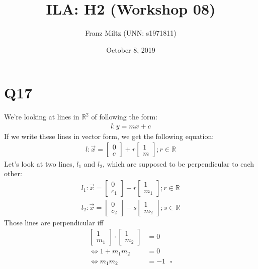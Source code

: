 \documentclass{article}
\title{ILA: H2 (Workshop 08)}
\author{Franz Miltz (UNN: s1971811)}
\date{October 8, 2019}
\begin{document}
\maketitle
\section*{Q17}
We're looking at lines in $\mathbb{R}^2$ of following the form:
\begin{align}
    l: y = mx + c
\end{align}
If we write these lines in vector form, we get the following equation:
\begin{align}
    l: \vec x =
    \begin{bmatrix}
        0 \\
        c
    \end{bmatrix}
    + r \begin{bmatrix}
        1 \\
        m
    \end{bmatrix};
    r \in \mathbb{R}
\end{align}
Let's look at two lines, $l_1$ and $l_2$, which are supposed to be perpendicular to each other:
\begin{align}
    l_1: \vec x =
    \begin{bmatrix}
        0 \\
        c_1
    \end{bmatrix}
    + r \begin{bmatrix}
        1 \\
        m_1
    \end{bmatrix};
    r \in \mathbb{R} \\
    l_2: \vec x =
    \begin{bmatrix}
        0 \\
        c_2
    \end{bmatrix}
    + s \begin{bmatrix}
        1 \\
        m_2
    \end{bmatrix};
    s \in \mathbb{R}
\end{align}
Those lines are perpendicular iff
\begin{align}
    \begin{bmatrix}
        1 \\m_1
    \end{bmatrix}
    \cdot \begin{bmatrix}
        1 \\m_2
    \end{bmatrix}
                             & = 0 \\
    \Leftrightarrow 1+m_1m_2 & =0  \\ \Leftrightarrow m_1m_2 &= -1\:\:\:\square
\end{align}
\end{document}

